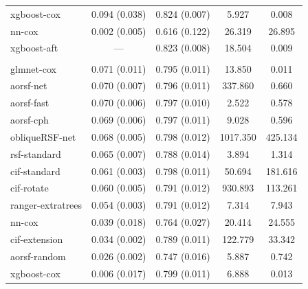 \documentclass{article}\usepackage[]{graphicx}\usepackage[]{xcolor}
\newenvironment{knitrout}{}{} %
\begin{document}
\begin{knitrout}
\begin{longtable}[t]{lcccc}
\hspace{1em}xgboost-cox & 0.094 (0.038) & 0.824 (0.007) & 5.927 & 0.008\\
\hspace{1em}nn-cox & 0.002 (0.005) & 0.616 (0.122) & 26.319 & 26.895\\
\hspace{1em}xgboost-aft & --- & 0.823 (0.008) & 18.504 & 0.009\\
\addlinespace[0.3em]
\multicolumn{5}{l}{\textit{\textbf{SPRINT; CVD death, n = 9361, p = 174}}}\\
\hline
\hspace{1em}glmnet-cox & 0.071 (0.011) & 0.795 (0.011) & 13.850 & 0.011\\
\hspace{1em}aorsf-net & 0.070 (0.007) & 0.796 (0.011) & 337.860 & 0.660\\
\hspace{1em}aorsf-fast & 0.070 (0.006) & 0.797 (0.010) & 2.522 & 0.578\\
\hspace{1em}aorsf-cph & 0.069 (0.006) & 0.797 (0.011) & 9.028 & 0.596\\
\hspace{1em}obliqueRSF-net & 0.068 (0.005) & 0.798 (0.012) & 1017.350 & 425.134\\
\hspace{1em}rsf-standard & 0.065 (0.007) & 0.788 (0.014) & 3.894 & 1.314\\
\hspace{1em}cif-standard & 0.061 (0.003) & 0.798 (0.011) & 50.694 & 181.616\\
\hspace{1em}cif-rotate & 0.060 (0.005) & 0.791 (0.012) & 930.893 & 113.261\\
\hspace{1em}ranger-extratrees & 0.054 (0.003) & 0.791 (0.012) & 7.314 & 7.943\\
\hspace{1em}nn-cox & 0.039 (0.018) & 0.764 (0.027) & 20.414 & 24.555\\
\hspace{1em}cif-extension & 0.034 (0.002) & 0.789 (0.011) & 122.779 & 33.342\\
\hspace{1em}aorsf-random & 0.026 (0.002) & 0.747 (0.016) & 5.887 & 0.742\\
\hspace{1em}xgboost-cox & 0.006 (0.017) & 0.799 (0.011) & 6.888 & 0.013\\

\end{longtable}
\end{knitrout}
\end{document}
